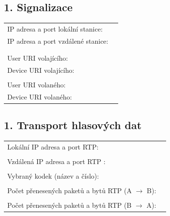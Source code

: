   \subsection*{1. Signalizace}
  \begin{tabular}{lp{2cm}}
    IP adresa a port lokální stanice: &\\
    IP adresa a port vzdálené stanice: &\\
    &\\
    &\\
    User URI volajícího: &\\
    Device URI volajícího: &\\
    &\\
    User URI volaného: &\\
    Device URI volaného: &\\
  \end{tabular}               

  \subsection*{1. Transport hlasových dat}
  \begin{tabular}{lp{2cm}}
    Lokální IP adresa a port RTP: &\\
    &\\
    Vzdálená IP adresa a port RTP : &\\
    &\\
    Vybraný kodek (název a číslo): &\\
    &\\
    Počet přenesených paketů a bytů RTP (A $\rightarrow$ B): &\\
    &\\
    Počet přenesených paketů a bytů RTP (B $\rightarrow$ A): &\\
\end{tabular}               
